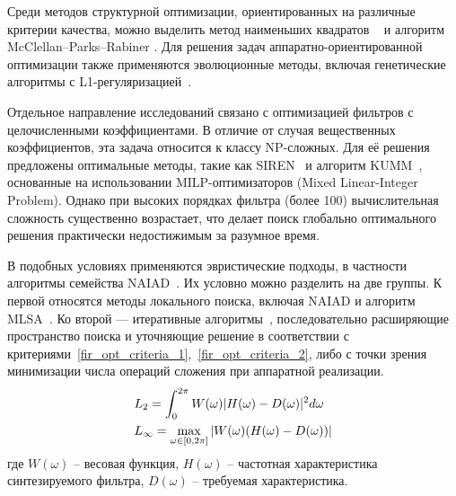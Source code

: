 

Среди методов структурной оптимизации, ориентированных на различные критерии качества, можно выделить метод наименьших квадратов ~\cite{Selesnick2005} и алгоритм McClellan–Parks–Rabiner \cite{McClellan1973}. Для решения задач аппаратно-ориентированной оптимизации также применяются эволюционные методы, включая генетические алгоритмы с L1-регуляризацией~\cite{Aggarwal2018}.

Отдельное направление исследований связано с оптимизацией фильтров с целочисленными коэффициентами. В отличие от случая вещественных коэффициентов, эта задача относится к классу NP-сложных. Для её решения предложены оптимальные методы, такие как SIREN~\cite{Aksoy2014} и алгоритм KUMM~\cite{Kumm2023}, основанные на использовании MILP-оптимизаторов (Mixed Linear-Integer Problem). Однако при высоких порядках фильтра (более 100) вычислительная сложность существенно возрастает, что делает поиск глобально оптимального решения практически недостижимым за разумное время.

В подобных условиях применяются эвристические подходы, в частности алгоритмы семейства NAIAD~\cite{Aksoy2014ISCAS,Xu2007,Shi2011,Yu2010,YliKaakinen2001,Shahein2012,Aktan2008,Chen1999}. Их условно можно разделить на две группы. К первой относятся методы локального поиска, включая NAIAD и алгоритм MLSA~\cite{Shahein2012}. Ко второй — итеративные алгоритмы~\cite{Xu2007,Shi2011,Yu2010}, последовательно расширяющие пространство поиска и уточняющие решение в соответствии с критериями~\eqref{fir_opt_criteria_1},~\eqref{fir_opt_criteria_2}, либо с точки зрения минимизации числа операций сложения при аппаратной реализации.
\begin{align}
	\displaystyle &L_2=\int_0^{2\pi}W(\omega)|H(\omega)-D(\omega)|^2d\omega 
	\label{fir_opt_criteria_1}
	\\
	\displaystyle &L_{\infty}=\max_{\omega\in[0, 2\pi]}|W(\omega)(H(\omega)-D(\omega))|
	\label{fir_opt_criteria_2}
\end{align}
где $W(\omega)$ -- весовая функция, $H(\omega)$ -- частотная характеристика синтезируемого фильтра, $D(\omega)$ -- требуемая характеристика.

